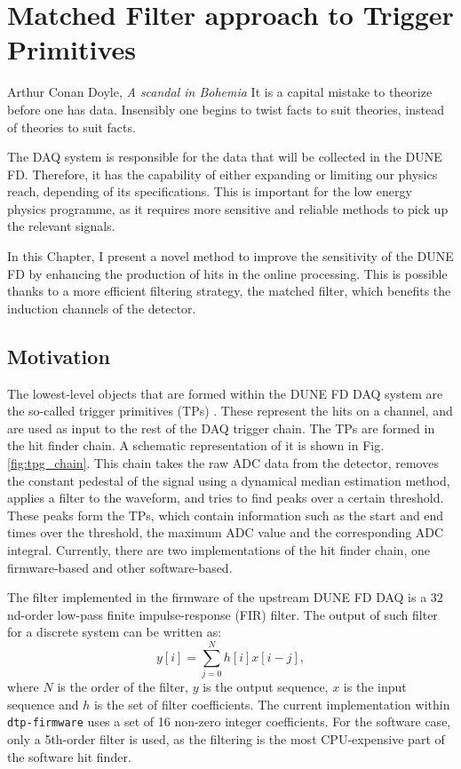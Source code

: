 \chapter{Matched Filter approach to Trigger Primitives}\label{chapter:matched_filter}

\begin{chapquote}{Arthur Conan Doyle, \textit{A scandal in Bohemia}}
	It is a capital mistake to theorize before one has data. Insensibly one begins to twist facts to suit theories, instead of theories to suit facts.
\end{chapquote}

The DAQ system is responsible for the data that will be collected in the DUNE FD. Therefore, it has the capability of either expanding or limiting our physics reach, depending of its specifications. This is important for the low energy physics programme, as it requires more sensitive and reliable methods to pick up the relevant signals.

In this Chapter, I present a novel method to improve the sensitivity of the DUNE FD by enhancing the production of hits in the online processing. This is possible thanks to a more efficient filtering strategy, the matched filter, which benefits the induction channels of the detector.

\section{Motivation}
\label{sec:matched_filter_motivation}

The lowest-level objects that are formed within the DUNE FD DAQ system are the so-called trigger primitives (TPs) \cite{DUNEDAQ2022}. These represent the hits on a channel, and are used as input to the rest of the DAQ trigger chain. The TPs are formed in the hit finder chain. A schematic representation of it is shown in Fig. \ref{fig:tpg_chain}. This chain takes the raw ADC data from the detector, removes the constant pedestal of the signal using a dynamical median estimation method, applies a filter to the waveform, and tries to find peaks over a certain threshold. These peaks form the TPs, which contain information such as the start and end times over the threshold, the maximum ADC value and the corresponding ADC integral. Currently, there are two implementations of the hit finder chain, one firmware-based and other software-based.

The filter implemented in the firmware of the upstream DUNE FD DAQ is a $32$nd-order low-pass finite impulse-response (FIR) filter. The output of such filter for a discrete system can be written as:
\begin{equation}\label{2.1.1}
	y[i] = \sum_{j=0}^{N} h[i] x[i-j],
\end{equation}
where $N$ is the order of the filter, $y$ is the output sequence, $x$ is the input sequence and $h$ is the set of filter coefficients. The current implementation within \texttt{dtp-firmware} \cite{dtp-firmware} uses a set of 16 non-zero integer coefficients. For the software case, only a 5th-order filter is used, as the filtering is the most CPU-expensive part of the software hit finder.

